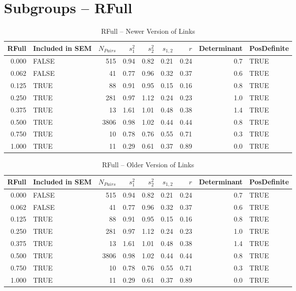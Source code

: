 \documentclass{article}\usepackage[]{graphicx}\usepackage[]{color}
\begin{document}
\section{Subgroups --  RFull }%
\begin{table}[ht]
\centering
\begin{tabular}{rlrrrrrrl}
  \hline
RFull & Included in SEM & $N_{Pairs}$ & $s_1^2$ & $s_2^2$ & $s_{1,2}$ & $r$ & Determinant & PosDefinite \\ 
  \hline
0.000 & FALSE & 515 & 0.94 & 0.82 & 0.21 & 0.24 & 0.7 & TRUE \\ 
  0.062 & FALSE & 41 & 0.77 & 0.96 & 0.32 & 0.37 & 0.6 & TRUE \\ 
  0.125 & TRUE & 88 & 0.91 & 0.95 & 0.15 & 0.16 & 0.8 & TRUE \\ 
  0.250 & TRUE & 281 & 0.97 & 1.12 & 0.24 & 0.23 & 1.0 & TRUE \\ 
  0.375 & TRUE & 13 & 1.61 & 1.01 & 0.48 & 0.38 & 1.4 & TRUE \\ 
  0.500 & TRUE & 3806 & 0.98 & 1.02 & 0.44 & 0.44 & 0.8 & TRUE \\ 
  0.750 & TRUE & 10 & 0.78 & 0.76 & 0.55 & 0.71 & 0.3 & TRUE \\ 
  1.000 & TRUE & 11 & 0.29 & 0.61 & 0.37 & 0.89 & 0.0 & TRUE \\ 
   \hline
\end{tabular}
\caption{RFull -- Newer Version of Links} 
\end{table}
\begin{table}[ht]
\centering
\begin{tabular}{rlrrrrrrl}
  \hline
RFull & Included in SEM & $N_{Pairs}$ & $s_1^2$ & $s_2^2$ & $s_{1,2}$ & $r$ & Determinant & PosDefinite \\ 
  \hline
0.000 & FALSE & 515 & 0.94 & 0.82 & 0.21 & 0.24 & 0.7 & TRUE \\ 
  0.062 & FALSE & 41 & 0.77 & 0.96 & 0.32 & 0.37 & 0.6 & TRUE \\ 
  0.125 & TRUE & 88 & 0.91 & 0.95 & 0.15 & 0.16 & 0.8 & TRUE \\ 
  0.250 & TRUE & 281 & 0.97 & 1.12 & 0.24 & 0.23 & 1.0 & TRUE \\ 
  0.375 & TRUE & 13 & 1.61 & 1.01 & 0.48 & 0.38 & 1.4 & TRUE \\ 
  0.500 & TRUE & 3806 & 0.98 & 1.02 & 0.44 & 0.44 & 0.8 & TRUE \\ 
  0.750 & TRUE & 10 & 0.78 & 0.76 & 0.55 & 0.71 & 0.3 & TRUE \\ 
  1.000 & TRUE & 11 & 0.29 & 0.61 & 0.37 & 0.89 & 0.0 & TRUE \\ 
   \hline
\end{tabular}
\caption{RFull -- Older Version of Links} 
\end{table}
\end{document}
